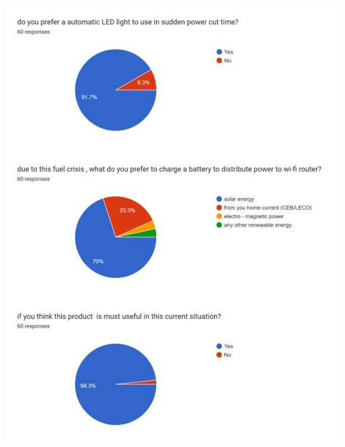 \documentclass[twocolumn]{article}
\begin{document}
\begin{titlepage}
    \begin{figure}[h]
        \centering
        \includegraphics{28.png}
        \label{fig:enter-label}
    \end{figure}

\end{titlepage}
\end{document}

